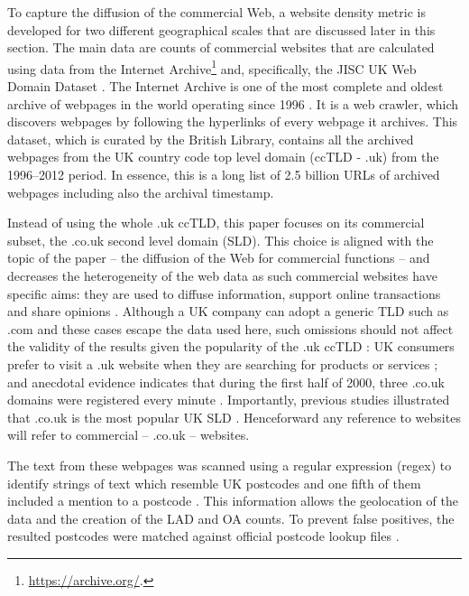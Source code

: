 \documentclass[
  authoryear,
  preprint,
  3p]{elsarticle}
\begin{document}
To capture the diffusion of the commercial Web, a website density metric
is developed for two different geographical scales that are discussed
later in this section. The main data are counts of commercial websites
that are calculated using data from the Internet Archive\footnote{\href{See\%20https://archive.org/}{https://archive.org/}.}
and, specifically, the JISC UK Web Domain Dataset \citep{ukwebarchive}.
The Internet Archive is one of the most complete and oldest archive of
webpages in the world operating since 1996
\citep{ainsworth2011much, holzmann2016dawn}. It is a web crawler, which
discovers webpages by following the hyperlinks of every webpage it
archives. This dataset, which is curated by the British Library,
contains all the archived webpages from the UK country code top level
domain (ccTLD - .uk) from the 1996--2012 period. In essence, this is a
long list of 2.5 billion URLs of archived webpages including also the
archival timestamp.

Instead of using the whole .uk ccTLD, this paper focuses on its
commercial subset, the .co.uk second level domain (SLD). This choice is
aligned with the topic of the paper -- the diffusion of the Web for
commercial functions -- and decreases the heterogeneity of the web data
as such commercial websites have specific aims: they are used to diffuse
information, support online transactions and share opinions
\citep{THELWALL2000441, blazquez2018big}. Although a UK company can
adopt a generic TLD such as .com and these cases escape the data used
here, such omissions should not affect the validity of the results given
the popularity of the .uk ccTLD \citep{tranosuk}: UK consumers prefer to
visit a .uk website when they are searching for products or services
\citep{hope}; and anecdotal evidence indicates that during the first
half of 2000, three .co.uk domains were registered every minute
\citep{oecd_coms}. Importantly, previous studies illustrated that .co.uk
is the most popular UK SLD \citep{tranosuk}. Henceforward any reference
to websites will refer to commercial -- .co.uk -- websites.

The text from these webpages was scanned using a regular expression
(regex) to identify strings of text which resemble UK postcodes and one
fifth of them included a mention to a postcode \citep{BL2013geo}. This
information allows the geolocation of the data and the creation of the
LAD and OA counts. To prevent false positives, the resulted postcodes
were matched against official postcode lookup files \citep{ons}.
\end{document}
